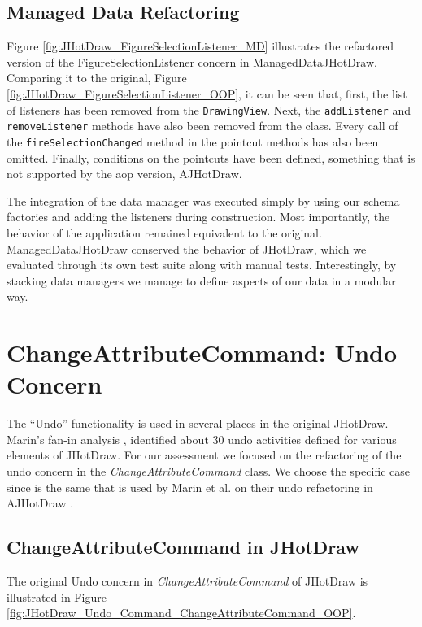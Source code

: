 \subsection{Managed Data Refactoring}
Figure \ref{fig:JHotDraw_FigureSelectionListener_MD} illustrates the refactored version of the FigureSelectionListener concern in ManagedDataJHotDraw.
Comparing it to the original, Figure \ref{fig:JHotDraw_FigureSelectionListener_OOP}, it can be seen that, first, the list of listeners has been removed from the \texttt{DrawingView}. 
Next, the \texttt{addListener} and \texttt{removeListener} methods have also been removed from the class.
Every call of the \texttt{fireSelectionChanged} method in the pointcut methods has also been omitted.
Finally, conditions on the pointcuts have been defined, something that is not supported by the \ac{aop} version, AJHotDraw.

The integration of the data manager was executed simply by using our schema factories and adding the listeners during construction.
Most importantly, the behavior of the application remained equivalent to the original.
ManagedDataJHotDraw conserved the behavior of JHotDraw, which we evaluated through its own test suite along with manual tests.
Interestingly, by stacking data managers we manage to define aspects of our data in a modular way.

\section{ChangeAttributeCommand: Undo Concern}
The ``Undo'' functionality is used in several places in the original JHotDraw.
Marin's fan-in analysis \cite{marin2004identifying}, identified about 30 undo activities defined for various elements of JHotDraw. 
For our assessment we focused on the refactoring of the undo concern in the \textit{ChangeAttributeCommand} class.
We choose the specific case since is the same that is used by Marin et al. on their undo refactoring in AJHotDraw \cite{marin2004refactoring}.

\subsection{ChangeAttributeCommand in JHotDraw}
The original Undo concern in \textit{ChangeAttributeCommand} of JHotDraw is illustrated in Figure \ref{fig:JHotDraw_Undo_Command_ChangeAttributeCommand_OOP}.

